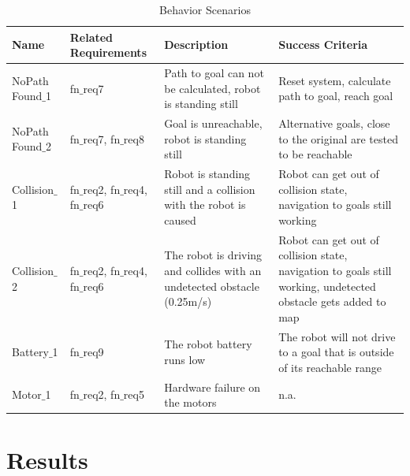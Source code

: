   	
\begin{table}[ht]
	\caption{Behavior Scenarios}
	\label{tab:behavior_scenarios}
	\begin{tabular}{| m{} | m{}| m{} | m{}|} 
	\hline
	\textbf{Name} & \textbf{Related Requirements} & \textbf{Description} & \textbf{Success Criteria}\\ 
  	\hline	
  	NoPath Found$\_$1 & fn$\_$req7 & Path to goal can not be calculated, robot is standing still &  
Reset system, calculate path to goal, reach goal \\
	\hline
	NoPath Found$\_$2 & fn$\_$req7, fn$\_$req8 & Goal is unreachable, robot is standing still & Alternative goals, close to the original are tested to be reachable \\
	\hline
	Collision$\_$1 & fn$\_$req2, fn$\_$req4, fn$\_$req6 & Robot is standing still and a collision with the robot is caused & Robot can get out of collision state, navigation to goals still working \\
	\hline
	Collision$\_$2 & fn$\_$req2, fn$\_$req4, fn$\_$req6 & The robot is driving and collides with an undetected obstacle (0.25m/s) &  
Robot can get out of collision state, navigation to goals still working, undetected obstacle gets added to map \\
	\hline
	Battery$\_$1 & fn$\_$req9 & The robot battery runs low & The robot will not drive to a goal that is outside of its reachable range \\
	\hline
	Motor$\_$1 & fn$\_$req2, fn$\_$req5 & Hardware failure on the motors & n.a. \\
	\hline
		
	\end{tabular}
\end{table}

\section{Results}

